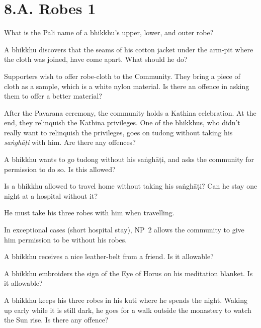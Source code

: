 \chapter{8.A. Robes 1}
\renewcommand*{\theChapterTitle}{8.A. Robes 1}

What is the Pali name of a bhikkhu's upper, lower, and outer robe?

\bigskip

A bhikkhu discovers that the seams of his cotton jacket under the arm-pit where
the cloth was joined, have come apart. What should he do?

\bigskip

Supporters wish to offer robe-cloth to the Community. They bring a piece of cloth as a sample, which
is a white nylon material. Is there an offence in asking them to offer a better
material?

\bigskip

After the Pavarana ceremony, the community holds a Kathina celebration.
At the end, they relinquish the Kathina privileges.
One of the bhikkhus, who didn't really want to relinquish the privileges,
goes on tudong without taking his \emph{saṅghāṭi} with him.
Are there any offences?

\bigskip

A bhikkhu wants to go tudong without his saṅghāṭi, and asks the community for
permission to do so. Is this allowed?

\bigskip

Is a bhikkhu allowed to travel home without taking his saṅghāṭi? Can he stay one
night at a hospital without it?

\begin{solution}
  He must take his three robes with him when travelling.

  In exceptional cases (short hospital stay), NP~2 allows the community to give
  him permission to be without his robes.
\end{solution}

\bigskip

A bhikkhu receives a nice leather-belt from a friend. Is it allowable?

\bigskip

A bhikkhu embroiders the sign of the Eye of Horus on his meditation blanket. Is it
allowable?

\bigskip

A bhikkhu keeps his three robes in his kuti where he spends the night.
Waking up early while it is still dark, he goes for a walk outside the monastery to watch the Sun rise.
Is there any offence?

